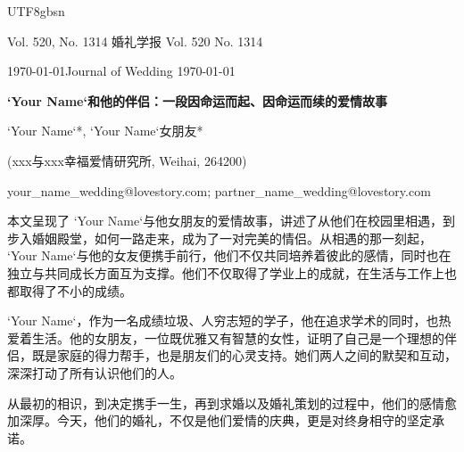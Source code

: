 \documentclass[a4paper]{article}
\begin{document}
\begin{CJK}{UTF8}{gbsn}

\begin{center}
{\large Vol. 520, No. 1314 \hfill 婚礼学报 \hfill Vol. 520 No. 1314}

{\large \today \hfill Journal of Wedding \hfill \today}
\end{center}

\noindent{}

\vspace{2em}

\begin{center}
{\Large\bf  `Your Name`和他的伴侣：一段因命运而起、因命运而续的爱情故事}
\end{center}

\vspace{1em}

\begin{center}
 `Your Name`*,  `Your Name`女朋友*
\end{center}

\begin{center}
\small (xxx与xxx幸福爱情研究所, Weihai, 264200)
\end{center}

\begin{center}
\small your\_name\_wedding@lovestory.com; partner\_name\_wedding@lovestory.com
\end{center}

\vspace{1em}

 本文呈现了 `Your Name`与他女朋友的爱情故事，讲述了从他们在校园里相遇，到步入婚姻殿堂，如何一路走来，成为了一对完美的情侣。从相遇的那一刻起， `Your Name`与他的女友便携手前行，他们不仅共同培养着彼此的感情，同时也在独立与共同成长方面互为支撑。他们不仅取得了学业上的成就，在生活与工作上也都取得了不小的成绩。

 `Your Name`，作为一名成绩垃圾、人穷志短的学子，他在追求学术的同时，也热爱着生活。他的女朋友，一位既优雅又有智慧的女性，证明了自己是一个理想的伴侣，既是家庭的得力帮手，也是朋友们的心灵支持。她们两人之间的默契和互动，深深打动了所有认识他们的人。

从最初的相识，到决定携手一生，再到求婚以及婚礼策划的过程中，他们的感情愈加深厚。今天，他们的婚礼，不仅是他们爱情的庆典，更是对终身相守的坚定承诺。


\end{CJK}
\end{document}

